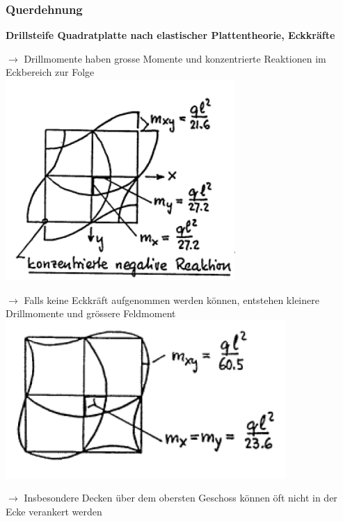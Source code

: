 	\begin{minipage}{0.5\linewidth}
		
		\subsubsection{Querdehnung}
			\textbf{Drillsteife Quadratplatte nach elastischer Plattentheorie, Eckkräfte} 
			
			$ \rightarrow $ Drillmomente haben grosse Momente und konzentrierte Reaktionen im Eckbereich zur Folge \\
			\includegraphics[width=0.3\linewidth]{images/DW5Querdehnung.PNG} 
			
			$ \rightarrow $ Falls keine Eckkräft aufgenommen werden können, entstehen kleinere Drillmomente und grössere Feldmoment \\
			\includegraphics[width=0.3\linewidth]{images/DW6Querdehnung.PNG}
			
			$ \rightarrow $ Insbesondere Decken über dem obersten Geschoss können öft nicht in der Ecke verankert werden
			
		
	\end{minipage}
